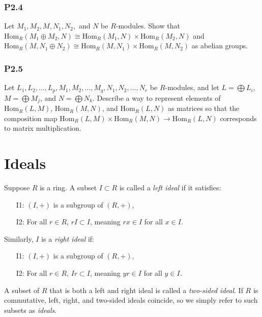 \documentclass[lang=cn,11pt]{template}
\begin{document}
\subsection*{P2.4} Let \( M_1, M_2, M, N_1, N_2, \) and \( N \) be \( R \)-modules. Show that \( \text{Hom}_R(M_1 \oplus M_2, N) \cong \text{Hom}_R(M_1, N) \times \text{Hom}_R(M_2, N) \) and \( \text{Hom}_R(M, N_1 \oplus N_2) \cong \text{Hom}_R(M, N_1) \times \text{Hom}_R(M, N_2) \) as abelian groups.

\subsection*{P2.5} Let \( L_1, L_2, \dots, L_p, M_1, M_2, \dots, M_q, N_1, N_2, \dots, N_r \) be \( R \)-modules, and let \( L = \bigoplus L_i \), \( M = \bigoplus M_j \), and \( N = \bigoplus N_k \). Describe a way to represent elements of \( \text{Hom}_R(L, M) \), \( \text{Hom}_R(M, N) \), and \( \text{Hom}_R(L, N) \) as matrices so that the composition map \( \text{Hom}_R(L, M) \times \text{Hom}_R(M, N) \to \text{Hom}_R(L, N) \) corresponds to matrix multiplication.













\chapter{Ideals}

\begin{definition}
Suppose \( R \) is a ring. A subset \( I \subset R \) is called a \textit{left ideal} if it satisfies:
\begin{itemize}
    \item[I1:] \( (I, +) \) is a subgroup of \( (R, +) \),
    \item[I2:] For all \( r \in R \), \( rI \subset I \), meaning \( rx \in I \) for all \( x \in I \).
\end{itemize}
Similarly, \( I \) is a \textit{right ideal} if:
\begin{itemize}
    \item[I1:] \( (I, +) \) is a subgroup of \( (R, +) \),
    \item[I2:] For all \( r \in R \), \( Ir \subset I \), meaning \( yr \in I \) for all \( y \in I \).
\end{itemize}
A subset of \( R \) that is both a left and right ideal is called a \textit{two-sided ideal}. If \( R \) is commutative, left, right, and two-sided ideals coincide, so we simply refer to such subsets as \textit{ideals}.
\end{definition}
\end{document}
